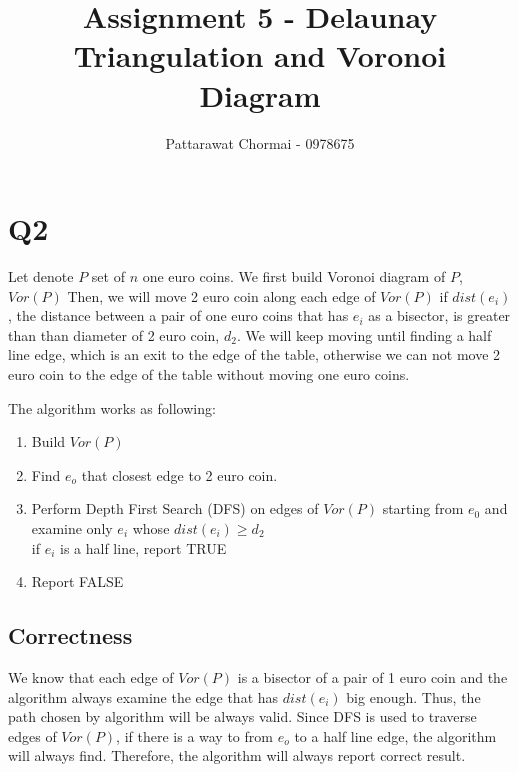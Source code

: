 \documentclass[12pt]{article}
\begin{document}
\title{Assignment 5 - Delaunay Triangulation and Voronoi Diagram }
\author{
	Pattarawat Chormai - 0978675 \\
}
\maketitle

\section*{Q2}
Let denote $P$ set of $n$ one euro coins. We first build Voronoi diagram of $P$, $Vor(P)$
Then, we will move 2 euro coin along each edge of $Vor(P)$ if $dist(e_i)$, the distance between a pair
of one euro coins that has $e_i$ as a bisector, is greater than than diameter of 2 euro coin,
$d_{2}$.
We will keep moving until finding a half line edge, which is an exit to the edge of the table,
otherwise we can not move 2 euro coin to the edge of the table without moving 
one euro coins.


The algorithm works as following:
\begin{enumerate}
    \item Build $Vor(P)$
    \item Find $e_o$ that closest edge to 2 euro coin.
    \item Perform Depth First Search (DFS) on edges of $Vor(P)$ starting from $e_0$ and examine only $e_i$ whose $dist(e_i) \ge d_2$ \\
       if $e_i$ is a half line, report TRUE
    \item Report FALSE
\end{enumerate}


\subsection*{Correctness}
We know that each edge of $Vor(P)$ is a bisector of a pair of 1 euro coin and the algorithm
always examine the edge that has $dist(e_i)$ big enough. Thus, the path chosen by algorithm
will be always valid. Since DFS is used to traverse edges of $Vor(P)$, if there is a way
to from $e_o$ to a half line edge, the algorithm will always find. Therefore, the algorithm
will always report correct result.
\end{document}
